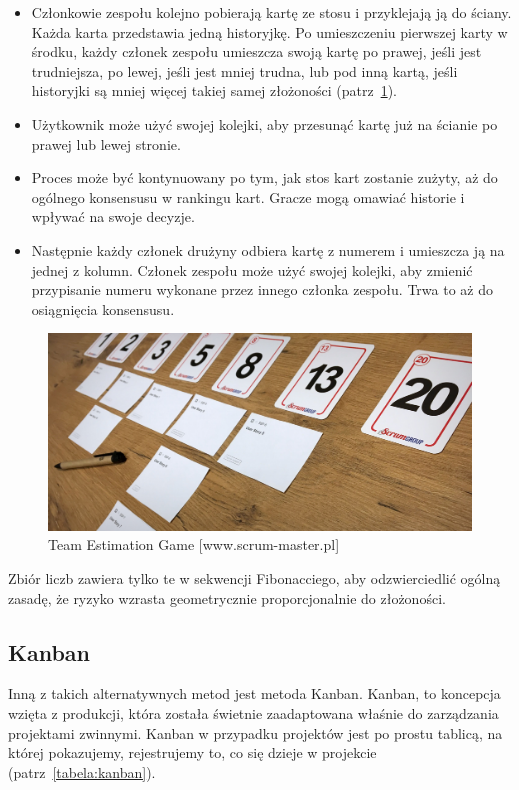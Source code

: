 \begin{itemize}
	\item Członkowie zespołu kolejno pobierają kartę ze stosu i przyklejają ją do ściany.
	Każda karta przedstawia jedną historyjkę.
	Po umieszczeniu pierwszej karty w środku, każdy członek zespołu umieszcza swoją kartę po prawej,
	jeśli jest trudniejsza, po lewej, jeśli jest mniej trudna,
	lub pod inną kartą, jeśli historyjki są mniej więcej takiej samej złożoności
	(patrz~\ref{rys:teamEstimationGame}).
	\item Użytkownik może użyć swojej kolejki, aby przesunąć kartę już na ścianie po prawej lub lewej stronie.
	\item Proces może być kontynuowany po tym, jak stos kart zostanie zużyty,
	aż do ogólnego konsensusu w rankingu kart. Gracze mogą omawiać historie i wpływać na swoje decyzje.
	\item Następnie każdy członek drużyny odbiera kartę z numerem i umieszcza ją na jednej z kolumn.
	Członek zespołu może użyć swojej kolejki, aby zmienić przypisanie numeru
	wykonane przez innego członka zespołu. Trwa to aż do osiągnięcia konsensusu.
\end{itemize}

\begin{figure}[H]
	\centering\includegraphics[width=.6\textwidth]{img/team_estimation_game.jpg}
	\caption{Team Estimation Game [www.scrum-master.pl]}\label{rys:teamEstimationGame}
\end{figure}

Zbiór liczb zawiera tylko te w sekwencji Fibonacciego, aby odzwierciedlić ogólną zasadę,
że ryzyko wzrasta geometrycznie proporcjonalnie do złożoności.\cite{www_teamEstimation}

\subsection{Kanban}

Inną z takich alternatywnych metod jest metoda Kanban. Kanban, to koncepcja wzięta z produkcji,
która została świetnie zaadaptowana właśnie do zarządzania projektami zwinnymi.
Kanban w przypadku projektów jest po prostu tablicą, na której pokazujemy,
rejestrujemy to, co się dzieje w projekcie (patrz~\ref{tabela:kanban}).

